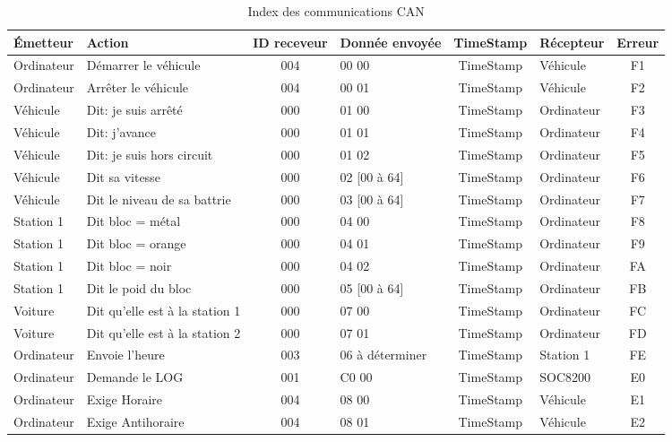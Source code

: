 \documentclass[10pt,a4paper,final]{article}
\begin{document}
\begin{spacing}{1.5}
\begin{table}[!ht]
\caption{Index des communications CAN}
\medskip
\centering
\begin{tabular}{|l|l|c|l|c|l|c|}
\hline 
\textbf{Émetteur} & \textbf{Action} & \textbf{ID receveur} & \textbf{Donnée envoyée} & \textbf{TimeStamp} & \textbf{Récepteur} & \textbf{Erreur}\\ 
\hline 
Ordinateur & Démarrer le véhicule & 004 & 00 00 & TimeStamp & Véhicule &  F1\\ 
\hline 
Ordinateur & Arrêter le véhicule & 004 & 00 01 & TimeStamp & Véhicule &  F2\\ 
\hline 
Véhicule & Dit: je suis arrêté & 000 & 01 00  & TimeStamp & Ordinateur &  F3\\
\hline 
Véhicule & Dit: j'avance & 000 & 01 01 & TimeStamp & Ordinateur  &  F4\\  
\hline 
Véhicule & Dit: je suis hors circuit & 000 & 01 02 & TimeStamp & Ordinateur &  F5\\ 
\hline 
Véhicule & Dit sa vitesse & 000 & 02 [00 à 64] & TimeStamp & Ordinateur &  F6\\ 
\hline 
Véhicule & Dit le niveau de sa battrie & 000 & 03 [00 à 64] & TimeStamp & Ordinateur &  F7\\ 
\hline 
Station 1 & Dit bloc = métal & 000 & 04 00 & TimeStamp & Ordinateur &  F8\\ 
\hline  
Station 1 & Dit bloc = orange & 000 & 04 01 & TimeStamp & Ordinateur &  F9\\
\hline 
Station 1 & Dit bloc = noir & 000 & 04 02 & TimeStamp & Ordinateur &  FA\\
\hline 
Station 1 & Dit le poid du bloc & 000 & 05 [00 à 64] & TimeStamp & Ordinateur &  FB\\ 
\hline 
Voiture & Dit qu'elle est à la station 1 & 000 & 07 00 & TimeStamp & Ordinateur &  FC\\ 
\hline 
Voiture & Dit qu'elle est à la station 2 & 000 & 07 01 & TimeStamp & Ordinateur &  FD\\
\hline 
Ordinateur & Envoie l'heure & 003 & 06 à déterminer & TimeStamp & Station 1 &  FE\\ 
\hline 
Ordinateur & Demande le LOG & 001 & C0 00 & TimeStamp & SOC8200 & E0\\ 
\hline
Ordinateur & Exige Horaire & 004 & 08 00 & TimeStamp & Véhicule & E1\\ 
\hline
Ordinateur & Exige Antihoraire & 004 & 08 01 & TimeStamp & Véhicule & E2\\ 
\hline
\end{tabular} 

\end{table}
\end{spacing}
\end{document}

